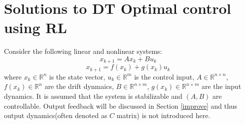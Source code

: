 \documentclass[conference]{IEEEtran}
\begin{document}
\section{Solutions to DT Optimal control using RL} \label{sol}
Consider the following linear and nonlinear systems:
\begin{equation}
x_{k+1} = Ax_{k} + Bu_{k}\label{linear}
\end{equation}
\begin{equation}
x_{k+1} = f(x_{k}) + g(x_{k})u_{k}\label{nonlinear}
\end{equation}
where \(x_{k} \in \mathbb{R}^{n}\) is the state vector, \(u_{k} \in \mathbb{R}^{m}\) is the control input, \(A \in \mathbb{R}^{n\times n}\), \(f(x_{k}) \in \mathbb{R}^{n}\) are the drift dynmaics, \(B \in \mathbb{R}^{n\times m}\), \(g(x_{k}) \in \mathbb{R}^{n\times m} \) are the input dynamics.
It is assumed that the system is stabilizable and \((A, B)\) are controllable. Output feedback will be discussed in Section \ref{improve} and thus output dynamics(often denoted as \(C\) matrix) is not introduced here.
\end{document}
